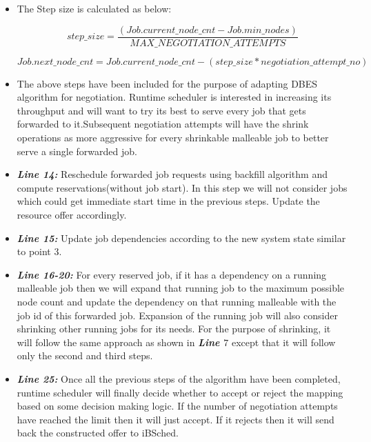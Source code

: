 \begin{itemize}
\item The Step size is calculated as below:
\vspace{-0.30in}
\begin{center}
\boldmath\begin{equation*}
step\_size = \frac{(Job.current\_node\_cnt - Job.min\_nodes)}{MAX\_NEGOTIATION\_ATTEMPTS}
\end{equation*}
\end{center}
\vspace{-0.30in}
\begin{center}
\boldmath\begin{equation*}
Job.next\_node\_cnt = Job.current\_node\_cnt - (step\_size * negotiation\_attempt\_no)
\end{equation*}
\end{center}
\item The above steps have been included for the purpose of adapting DBES algorithm for negotiation. Runtime scheduler is interested in increasing its throughput and will want to try its best to serve every job that gets forwarded to it.Subsequent negotiation attempts will have the shrink operations as more aggressive for every shrinkable malleable job to better serve a single forwarded job.
\item \textbf{\textit{Line 14:}} Reschedule forwarded job requests using backfill algorithm and compute reservations(without job start). In this step we will not consider jobs which could get immediate start time in the previous steps. Update the resource offer accordingly.
\item \textbf{\textit{Line 15:}} Update job dependencies according to the new system state similar to point $3$.
\item \textbf{\textit{Line 16-20:}} For every reserved job, if it has a dependency on a running malleable job then we will expand that running job to the maximum possible node count and update the dependency on that running malleable with the job id of this forwarded job. Expansion of the running job will also consider shrinking other running jobs for its needs. For the purpose of shrinking, it will follow the same approach as shown in \textbf{\textit{Line $7$}} except that it will follow only the second and third steps.
\item \textbf{\textit{Line 25:}} Once all the previous steps of the algorithm have been completed, runtime scheduler will finally decide whether to accept or reject the mapping based on some decision making logic. If the number of negotiation attempts have reached the limit then it will just accept. If it rejects then it will send back the constructed offer to iBSched.
\end{itemize}
